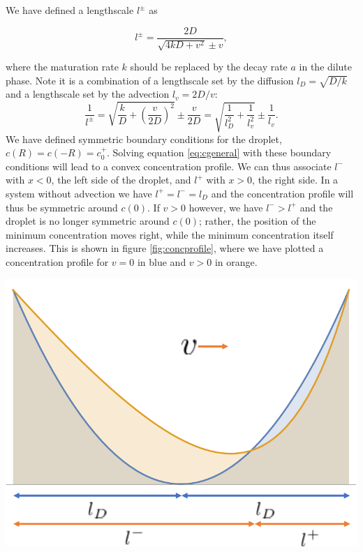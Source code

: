 \documentclass{Dissertate}
\let\origfigure\figure
\let\endorigfigure\endfigure
\renewenvironment{figure}[1][2] {
    \expandafter\origfigure\expandafter[H]
} {
    \endorigfigure
}
\begin{document}
We have defined a lengthscale \(l^\pm\) as

\begin{equation}
l^\pm= \frac{2D}{\sqrt{4kD+v^2}\pm v },
\label{eq:lengthscale}\end{equation}

where the maturation rate \(k\) should be replaced by the decay rate
\(a\) in the dilute phase. Note it is a combination of a lengthscale set
by the diffusion \(l_D=\sqrt{D/k}\) and a lengthscale set by the
advection \(l_v=2D/v\): \[
\frac{1}{l^{\pm}} = \sqrt{\frac{k}{D}+\left(\frac{v}{2D}\right)^2}\pm\frac{v}{2D}=\sqrt{\frac{1}{l_D^2}+\frac{1}{l_v^2}}\pm\frac{1}{l_{v}}.
\] We have defined symmetric boundary conditions for the droplet,
\(c(R)=c(-R)=c_0^+\). Solving equation \ref{eq:cgeneral} with these
boundary conditions will lead to a convex concentration profile. We can
thus associate \(l^-\) with \(x<0\), the left side of the droplet, and
\(l^+\) with \(x>0\), the right side. In a system without advection we
have \(l^+=l^-=l_D\) and the concentration profile will thus be
symmetric around \(c(0)\). If \(v>0\) however, we have \(l^- >l^+\) and
the droplet is no longer symmetric around \(c(0)\); rather, the position
of the minimum concentration moves right, while the minimum
concentration itself increases. This is shown in figure
\ref{fig:concprofile}, where we have plotted a concentration
profile for \(v=0\) in blue and \(v>0\) in orange.

\begin{figure}
\hypertarget{fig:concprofile}{%
\centering
\includegraphics{source/figures/pdf/concprofile.pdf}
\caption{Concentration profiles inside an active droplet for v=0 (blue)
and v\textgreater{}0 (orange). Note that the minimum concentration
increases and that its location moves right.}\label{fig:concprofile}
}
\end{figure}
\end{document}
